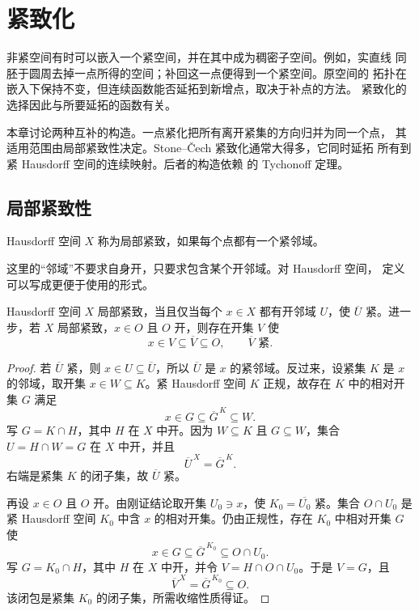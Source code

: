 \chapter{紧致化}
\label{chap:compactifications}

非紧空间有时可以嵌入一个紧空间，并在其中成为稠密子空间。例如，实直线
同胚于圆周去掉一点所得的空间；补回这一点便得到一个紧空间。原空间的
拓扑在嵌入下保持不变，但连续函数能否延拓到新增点，取决于补点的方法。
紧致化的选择因此与所要延拓的函数有关。

本章讨论两种互补的构造。一点紧化把所有离开紧集的方向归并为同一个点，
其适用范围由局部紧致性决定。Stone--Čech 紧致化通常大得多，它同时延拓
所有到紧 Hausdorff 空间的连续映射。后者的构造依赖
的 Tychonoff 定理。

\section{局部紧致性}

\begin{definition}
Hausdorff 空间 \(X\) 称为局部紧致，如果每个点都有一个紧邻域。
\end{definition}

这里的“邻域”不要求自身开，只要求包含某个开邻域。对 Hausdorff 空间，
定义可以写成更便于使用的形式。

\begin{proposition}[相对紧邻域]
\label{prop:locally-compact-shrinking}
Hausdorff 空间 \(X\) 局部紧致，当且仅当每个 \(x\in X\) 都有开邻域
\(U\)，使 \(\overline U\) 紧。进一步，若 \(X\) 局部紧致，\(x\in O\)
且 \(O\) 开，则存在开集 \(V\) 使
\[
 x\in V\subseteq\overline V\subseteq O,
 \qquad \overline V\text{ 紧}.
\]
\end{proposition}

\begin{proof}
若 \(\overline U\) 紧，则 \(x\in U\subseteq\overline U\)，所以
\(\overline U\) 是 \(x\) 的紧邻域。反过来，设紧集
\(K\) 是 \(x\) 的邻域，取开集 \(x\in W\subseteq K\)。紧 Hausdorff
空间 \(K\) 正规，故存在 \(K\) 中的相对开集 \(G\) 满足
\[
 x\in G\subseteq\overline G^{\,K}\subseteq W.
\]
写 \(G=K\cap H\)，其中 \(H\) 在 \(X\) 中开。因为 \(W\subseteq K\)
且 \(G\subseteq W\)，集合 \(U=H\cap W=G\) 在 \(X\) 中开，并且
\[
 \overline U^{\,X}=\overline G^{\,K}.
\]
右端是紧集 \(K\) 的闭子集，故 \(\overline U\) 紧。

再设 \(x\in O\) 且 \(O\) 开。由刚证结论取开集 \(U_0\ni x\)，使
\(K_0=\overline{U_0}\) 紧。集合 \(O\cap U_0\) 是紧 Hausdorff 空间
\(K_0\) 中含 \(x\) 的相对开集。仍由正规性，存在 \(K_0\) 中相对开集
\(G\) 使
\[
 x\in G\subseteq\overline G^{\,K_0}\subseteq O\cap U_0.
\]
写 \(G=K_0\cap H\)，其中 \(H\) 在 \(X\) 中开，并令
\(V=H\cap O\cap U_0\)。于是 \(V=G\)，且
\[
 \overline V^{\,X}=\overline G^{\,K_0}\subseteq O.
\]
该闭包是紧集 \(K_0\) 的闭子集，所需收缩性质得证。
\end{proof}

